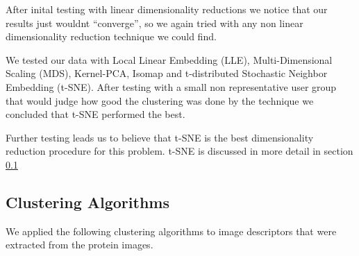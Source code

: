 \documentclass[journal]{vgtc}       %
\begin{document}
After inital testing with linear dimensionality reductions we notice that our results just wouldnt ``converge'', so we again tried with any non linear dimensionality reduction technique we could find.

We tested our data with Local Linear Embedding (LLE), Multi-Dimensional Scaling (MDS), Kernel-PCA, Isomap and t-distributed Stochastic Neighbor Embedding (t-SNE).
After testing with a small non representative user group that would judge how good the clustering was done by the technique we concluded that t-SNE performed the best.

Further testing leads us to believe that t-SNE is the best dimensionality reduction procedure for this problem. t-SNE is discussed in more detail in section \ref{sec:clusteringa}


\subsection{Clustering Algorithms}\label{sec:clusteringa}
We applied the following clustering algorithms to image descriptors that were extracted from the protein images.
\end{document}
